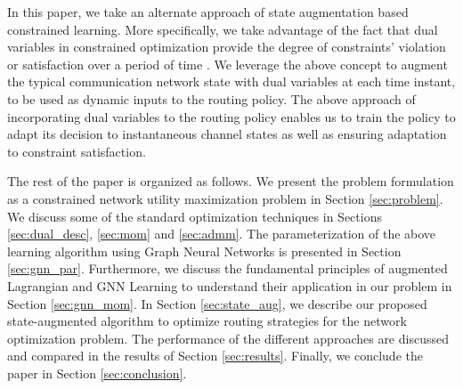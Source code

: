 \documentclass[lettersize,journal]{IEEEtran}
\begin{document}
In this paper, we take an alternate approach of state augmentation based constrained learning. More specifically, we take advantage of the fact that dual variables in constrained optimization provide the degree of constraints' violation or satisfaction over a period of time \cite{calvo2021state}. We leverage the above concept to augment the typical communication network state with dual variables at each time instant, to be used as dynamic inputs to the routing policy. The above approach of incorporating dual variables to the routing policy enables us to train the policy to adapt its decision to instantaneous channel states as well as ensuring adaptation to constraint satisfaction. %

The rest of the paper is organized as follows. %
We present the problem formulation as a constrained network utility maximization problem in Section \ref{sec:problem}. We discuss some of the standard optimization techniques in Sections \ref{sec:dual_desc}, \ref{sec:mom} and \ref{sec:admm}. %
The parameterization of the above learning algorithm using Graph Neural Networks is presented in Section \ref{sec:gnn_par}. Furthermore, we discuss the fundamental principles of augmented Lagrangian and GNN Learning to understand their application in our problem in Section \ref{sec:gnn_mom}. In Section \ref{sec:state_aug}, we describe our proposed state-augmented algorithm to optimize routing strategies for the network optimization problem. The performance of the different approaches are discussed and compared in the results of Section \ref{sec:results}. Finally, we conclude the paper in Section \ref{sec:conclusion}.
\end{document}
